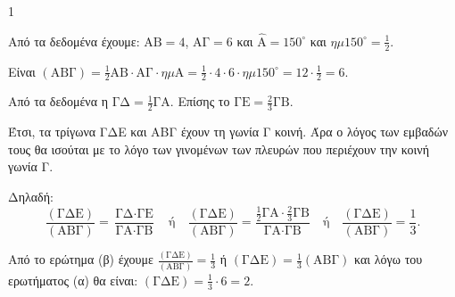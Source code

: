 \begin{ylh}{1}
    \item [ΛΥΣΗ]
\end{ylh}
Από τα δεδομένα έχουμε: $\text{ΑΒ}=4$, $\text{ΑΓ}=6$ και $\hat{\text{Α}} = 150^{\circ}$ και $\eta\mu150^{\circ} = \frac{1}{2}$.
\begin{alist}
\item Είναι $(\text{ΑΒΓ}) = \frac{1}{2} \text{ΑΒ}\cdot\text{ΑΓ}\cdot\eta\mu\text{Α} = \frac{1}{2}\cdot 4 \cdot 6 \cdot\eta\mu150^{\circ} = 12\cdot\frac{1}{2} = 6$.

\item Από τα δεδομένα η $\text{ΓΔ} = \frac{1}{2}\text{ΓΑ}$. Επίσης το $\text{ΓΕ} = \frac{2}{3}\text{ΓΒ}$.

Έτσι, τα τρίγωνα ΓΔΕ και ΑΒΓ έχουν τη γωνία Γ κοινή. Άρα ο λόγος των εμβαδών τους θα ισούται με το λόγο των γινομένων των πλευρών που περιέχουν την κοινή γωνία Γ.

Δηλαδή:
\[ \frac{(\text{ΓΔΕ})}{(\text{ΑΒΓ})} = \frac{\text{ΓΔ}\cdot\text{ΓΕ}}{\text{ΓΑ}\cdot\text{ΓΒ}} \quad \text{ή} \quad \frac{(\text{ΓΔΕ})}{(\text{ΑΒΓ})} = \frac{\frac{1}{2}\text{ΓΑ}\cdot\frac{2}{3}\text{ΓΒ}}{\text{ΓΑ}\cdot\text{ΓΒ}} \quad \text{ή} \quad \frac{(\text{ΓΔΕ})}{(\text{ΑΒΓ})} = \frac{1}{3}. \]

\item Από το ερώτημα (β) έχουμε $\frac{(\text{ΓΔΕ})}{(\text{ΑΒΓ})} = \frac{1}{3}$ ή $(\text{ΓΔΕ}) = \frac{1}{3}(\text{ΑΒΓ})$
και λόγω του ερωτήματος (α) θα είναι: $(\text{ΓΔΕ}) = \frac{1}{3}\cdot 6 = 2$.
\end{alist}